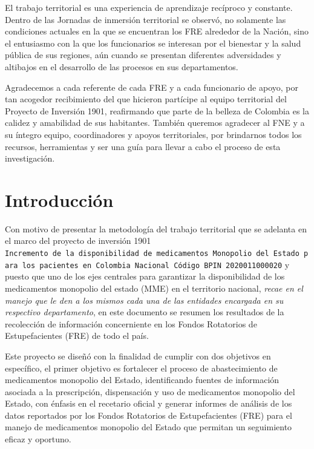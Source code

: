\documentclass[
  oneside]{book}
\begin{document}
El trabajo territorial es una experiencia de aprendizaje recíproco y constante. Dentro de las Jornadas de inmersión territorial se observó, no solamente las condiciones actuales en la que se encuentran los FRE alrededor de la Nación, sino el entusiasmo con la que los funcionarios se interesan por el bienestar y la salud pública de sus regiones, aún cuando se presentan diferentes adversidades y altibajos en el desarrollo de las procesos en sus departamentos.

Agradecemos a cada referente de cada FRE y a cada funcionario de apoyo, por tan acogedor recibimiento del que hicieron partícipe al equipo territorial del Proyecto de Inversión 1901, reafirmando que parte de la belleza de Colombia es la calidez y amabilidad de sus habitantes. También queremos agradecer al FNE y a su íntegro equipo, coordinadores y apoyos territoriales, por brindarnos todos los recursos, herramientas y ser una guía para llevar a cabo el proceso de esta investigación.

\hypertarget{introducciuxf3n}{%
\chapter{Introducción}\label{introducciuxf3n}}

Con motivo de presentar la metodología del trabajo territorial que se adelanta en el marco del proyecto de inversión 1901 \texttt{Incremento\ de\ la\ disponibilidad\ de\ medicamentos\ Monopolio\ del\ Estado\ para\ los\ pacientes\ en\ Colombia\ Nacional\ Código\ BPIN\ 2020011000020} y puesto que uno de los ejes centrales para garantizar la disponibilidad de los medicamentos monopolio del estado (MME) en el territorio nacional, \emph{recae en el manejo que le den a los mismos cada una de las entidades encargada en su respectivo departamento}, en este documento se resumen los resultados de la recolección de información concerniente en los Fondos Rotatorios de Estupefacientes (FRE) de todo el país.

Este proyecto se diseñó con la finalidad de cumplir con dos objetivos en específico, el primer objetivo es fortalecer el proceso de abastecimiento de medicamentos monopolio del Estado, identificando fuentes de información asociada a la prescripción, dispensación y uso de medicamentos monopolio del Estado, con énfasis en el recetario oficial y generar informes de análisis de los datos reportados por los Fondos Rotatorios de Estupefacientes (FRE) para el manejo de medicamentos monopolio del Estado que permitan un seguimiento eficaz y oportuno.
\end{document}
